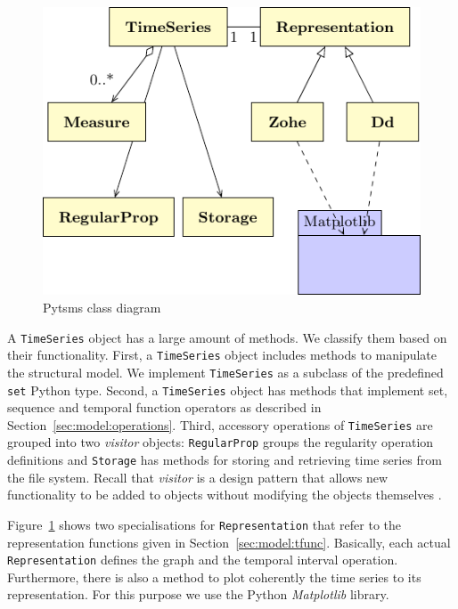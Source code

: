 \begin{figure}[tp]
  \centering
  \includegraphics{fig_pytsms_uml.pdf}
  \caption{Pytsms  class diagram}
  \label{fig:implementacio:pytsms-uml}
\end{figure}


A \texttt{TimeSeries} object has a large amount of methods. We
classify them based on their functionality. First, a
\texttt{TimeSeries} object includes methods to manipulate the
structural model. We implement \texttt{TimeSeries} as a subclass of
the predefined \texttt{set} Python type. Second, a \texttt{TimeSeries}
object has methods that implement set, sequence and temporal function
operators as described in Section~\ref{sec:model:operations}.  Third,
accessory operations of \texttt{TimeSeries} are grouped into two
\emph{visitor} objects: \texttt{RegularProp} groups the regularity
operation definitions and \texttt{Storage} has methods for storing and
retrieving time series from the file system. Recall that
\emph{visitor} is a design pattern that allows new functionality to be
added to objects without modifying the objects themselves
\cite{ziade08:expert_python_programming:visitor,martin02:visitor}.

Figure~\ref{fig:implementacio:pytsms-uml} shows two specialisations
for \texttt{Representation} that refer to the representation functions
given in Section~\ref{sec:model:tfunc}. Basically, each actual
\texttt{Representation} defines the graph and the temporal interval
operation. Furthermore, there is also a method to plot coherently the
time series to its representation. For this purpose we use the Python
\emph{Matplotlib} library.
%



